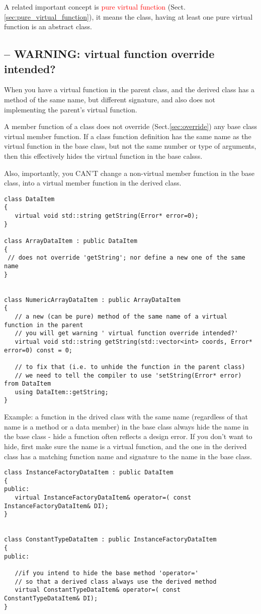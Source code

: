 A related important concept is \textcolor{red}{pure virtual function}
(Sect.\ref{sec:pure_virtual_function}), it means the class, having at least one
pure virtual function is an abstract class.

\subsection{-- WARNING: virtual function override intended?}

When you have a virtual function in the parent class, and the derived class has
a method of the same name, but different signature, and also does not
implementing the parent's virtual function.

A member function of a class does not override (Sect.\ref{sec:override}) any
base class virtual member function. 
If a class function definition has the same name as the virtual function in the
base class, but not the same number or type of arguments, then this effectively
hides the virtual function in the base calsss.

Also, importantly, you CAN'T change a non-virtual member function in the base
class, into a virtual member function in the derived class.


\begin{lstlisting}
class DataItem
{
   virtual void std::string getString(Error* error=0);
}

class ArrayDataItem : public DataItem
{
 // does not override 'getString'; nor define a new one of the same name
}


class NumericArrayDataItem : public ArrayDataItem
{
   // a new (can be pure) method of the same name of a virtual function in the parent
   // you will get warning ' virtual function override intended?'
   virtual void std::string getString(std::vector<int> coords, Error* error=0) const = 0;
      
   // to fix that (i.e. to unhide the function in the parent class)
   // we need to tell the compiler to use 'setString(Error* error) from DataItem
   using DataItem::getString;
}
\end{lstlisting}


Example: a function in the drived class with the same name (regardless of that
name is a method or a data member) in the base class always hide the name in the
base class - hide a function often reflects a design error. If you don't want to
hide, first make sure the name is a virtual function, and the one in the derived
class has a matching function name and signature to the name in the base class.
\begin{lstlisting}
class InstanceFactoryDataItem : public DataItem
{
public:
   virtual InstanceFactoryDataItem& operator=( const InstanceFactoryDataItem& DI);
}


class ConstantTypeDataItem : public InstanceFactoryDataItem
{
public:

   //if you intend to hide the base method 'operator='
   // so that a derived class always use the derived method
   virtual ConstantTypeDataItem& operator=( const ConstantTypeDataItem& DI); 
}
\end{lstlisting}



